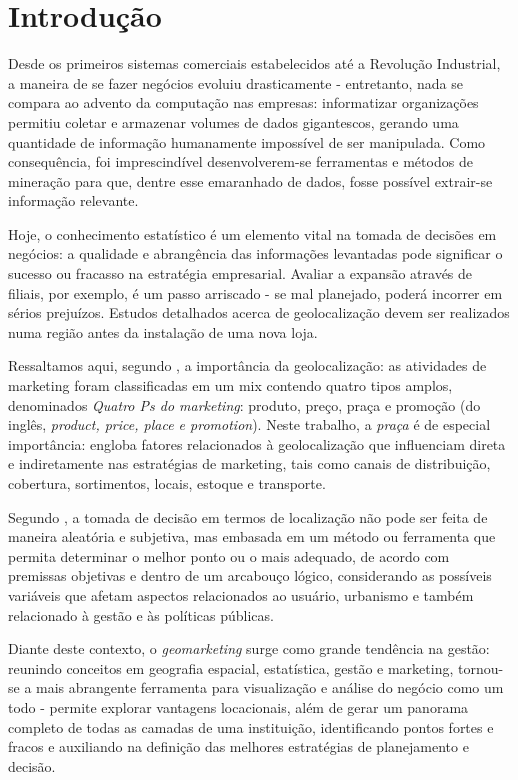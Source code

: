 ﻿
\chapter{Introdução}
\label{introducao}

Desde os primeiros sistemas comerciais estabelecidos até a Revolução Industrial,
a maneira de se fazer negócios evoluiu drasticamente - entretanto, nada se
compara ao advento da computação nas empresas: informatizar
organizações permitiu coletar e armazenar volumes de dados
gigantescos, gerando uma quantidade de informação humanamente impossível de
ser manipulada. Como consequência, foi imprescindível desenvolverem-se ferramentas e
métodos de mineração para que, dentre esse emaranhado de dados, fosse possível extrair-se informação relevante.

Hoje, o conhecimento estatístico é um elemento vital na tomada de decisões em negócios: a qualidade e abrangência das informações levantadas pode significar o sucesso ou fracasso na estratégia empresarial. Avaliar a expansão através de filiais, por exemplo, é um passo arriscado - se mal planejado, poderá incorrer em sérios prejuízos. Estudos detalhados acerca de geolocalização devem ser realizados numa região antes da instalação de uma nova loja.

Ressaltamos aqui, segundo , a importância da
geolocalização: as atividades de marketing foram classificadas em um mix
contendo quatro tipos amplos, denominados \emph{Quatro Ps do marketing}:
produto, preço, praça e promoção (do inglês, \emph{product, price, place e
promotion}). Neste trabalho, a \emph{praça} é de especial importância: engloba
fatores relacionados à geolocalização que influenciam direta e indiretamente nas
estratégias de marketing, tais como canais de distribuição, cobertura,
sortimentos, locais, estoque e transporte.

Segundo , a tomada de decisão em termos de
localização não pode ser feita de maneira aleatória e subjetiva, mas embasada em
um método ou ferramenta que permita determinar o melhor ponto ou o mais
adequado, de acordo com premissas objetivas e dentro de um arcabouço lógico,
considerando as possíveis variáveis que afetam aspectos relacionados ao usuário,
urbanismo e também relacionado à gestão e às políticas públicas.

Diante deste contexto, o \emph{geomarketing} surge como grande tendência na gestão: reunindo conceitos em geografia espacial, estatística, gestão e marketing, tornou-se a mais abrangente ferramenta para visualização e análise do negócio como um todo - permite explorar vantagens locacionais, além de gerar um panorama completo de todas as camadas de uma instituição, identificando pontos fortes e fracos e auxiliando na definição das melhores estratégias de planejamento e decisão.

